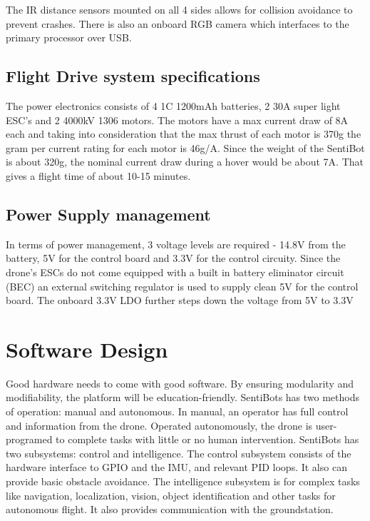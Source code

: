 \documentclass[12pt]{article}
\begin{document}
The IR distance sensors mounted on all 4 sides allows for collision avoidance to prevent crashes. There is also an onboard RGB camera which interfaces to the primary processor over USB. 


\subsection{Flight Drive system specifications}

The power electronics consists of 4 1C 1200mAh batteries, 2 30A super light ESC’s and 2 4000kV 1306 motors. The motors have a max current draw of 8A each and taking into consideration that the max thrust of each motor is 370g the gram per current rating for each motor is 46g/A. Since the weight of the SentiBot is about 320g, the nominal current draw during a hover would be about 7A. That gives a flight time of about 10-15 minutes. 

\subsection{Power Supply management}

In terms of power management, 3 voltage levels are required - 14.8V from the battery, 5V for the control board and 3.3V for the control circuity. Since the drone’s ESCs do not come equipped with a built in battery eliminator circuit (BEC) an external switching regulator is used to supply clean 5V for the control board. The onboard 3.3V LDO further steps down the voltage from 5V to 3.3V

\section{Software Design}

Good hardware needs to come with good software. By ensuring modularity and modifiability, the platform will be education-friendly. SentiBots has two methods of operation: manual and autonomous. In manual, an operator has full control and information from the drone. Operated autonomously, the drone is user-programed to complete tasks with little or no human intervention. SentiBots has two subsystems: control and intelligence. The control subsystem consists of the hardware interface to GPIO and the IMU, and relevant PID loops. It also can provide basic obstacle avoidance. The intelligence subsystem is for complex tasks like navigation, localization, vision, object identification and other tasks for autonomous flight. It also provides communication with the groundstation.
\end{document}
